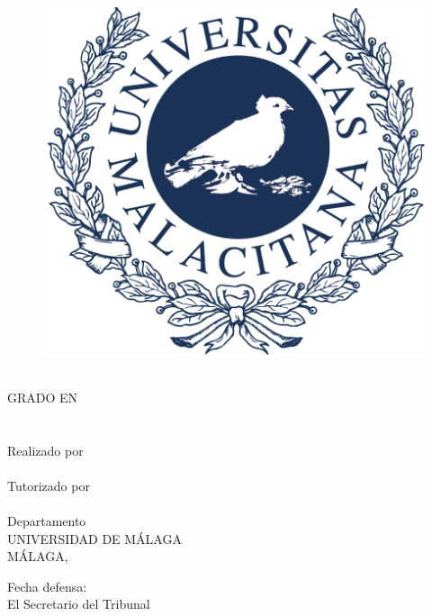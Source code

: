 \begin{center}
  \begin{figure}[h]
    \centering
    \includegraphics[scale=0.2]{images/marcauma.png}
  \end{figure}

  \MakeUppercase{\facultad} \\
  GRADO EN \MakeUppercase{\grado} \\
  \vspace{3cm}
  {\large	\tituloes} \\
  \ifdef{\subtituloes}{
    \textit{\subtituloes} \\
  }{}
  {\large	\tituloen} \\
  \ifdef{\subtituloen}{
    \textit{\subtituloen} \\
  }{}  \bigbreak
  Realizado por \\
  \textbf{\alumno} \\
  Tutorizado por \\
  \textbf{\tutor} \\
  Departamento \\
  \textbf{\departamento}
  \bigbreak
  UNIVERSIDAD DE MÁLAGA \\
  MÁLAGA, \fecha
\end{center}

\vfill

Fecha defensa: \\
El Secretario del Tribunal
